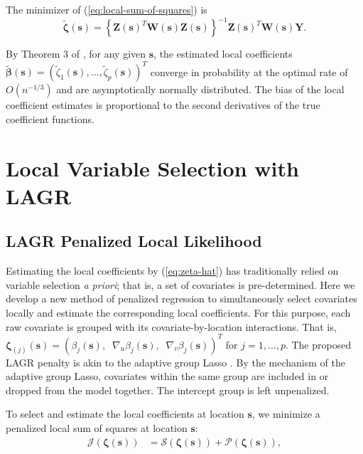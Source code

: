 \documentclass[authoryear,review, 12pt]{elsarticle}
\begin{document}
The minimizer of (\ref{eq:local-sum-of-squares}) is
\begin{equation}
\tilde{\bm{\zeta}}(\bm{s})=\left\{ \bm{Z}(\bm{s})^{T}\bm{W}\!(\bm{s})\bm{Z}(\bm{s})\right\} ^{-1}\bm{Z}(\bm{s})^{T}\bm{W}\!(\bm{s})\bm{Y}.\label{eq:zeta-hat}
\end{equation}

By Theorem 3 of \citet{Sun-Yan-Zhang-Lu-2014}, for any given $\bm{s}$,
the estimated local coefficients $\tilde{\bm{\beta}}(\bm{s})=\left(\tilde{\zeta}_{1}(\bm{s}),\dots,\tilde{\zeta}_{p}(\bm{s})\right)^{T}$
converge in probability at the optimal rate of $O\left(n^{-1/3}\right)$
and are asymptotically normally distributed. The bias of the local
coefficient estimates is proportional to the second derivatives of
the true coefficient functions.

\section{Local Variable Selection with LAGR\label{sec:lagr-gaussian}}

\subsection{LAGR Penalized Local Likelihood}

Estimating the local coefficients by (\ref{eq:zeta-hat}) has traditionally
relied on variable selection \emph{a priori}; that is, a set of covariates
is pre-determined. Here we develop a new method of penalized regression
to simultaneously select covariates locally and estimate the corresponding
local coefficients. For this purpose, each raw covariate is grouped
with its covariate-by-location interactions. That is, $\bm{\zeta}_{(j)}(\bm{s})=\left(\beta_{j}(\bm{s}),\;\;\nabla_{u}\beta_{j}(\bm{s}),\;\;\nabla_{v}\beta_{j}(\bm{s})\right)^{T}$
for $j=1,\dots,p$. The proposed LAGR penalty is akin to the adaptive
group Lasso \citep{Yuan-Lin-2006,Wang-Leng-2008}. By the mechanism
of the adaptive group Lasso, covariates within the same group are
included in or dropped from the model together. The intercept group
is left unpenalized.

To select and estimate the local coefficients at location $\bm{s}$,
we minimize a penalized local sum of squares at location $\bm{s}$:
\begin{align}
\mathcal{J}\left(\bm{\zeta}(\bm{s})\right) & =\mathcal{S}\left(\bm{\zeta}(\bm{s})\right)+\mathcal{P}\left(\bm{\zeta}(\bm{s})\right),\label{eq:penalized-least-squares}
\end{align}
\end{document}
